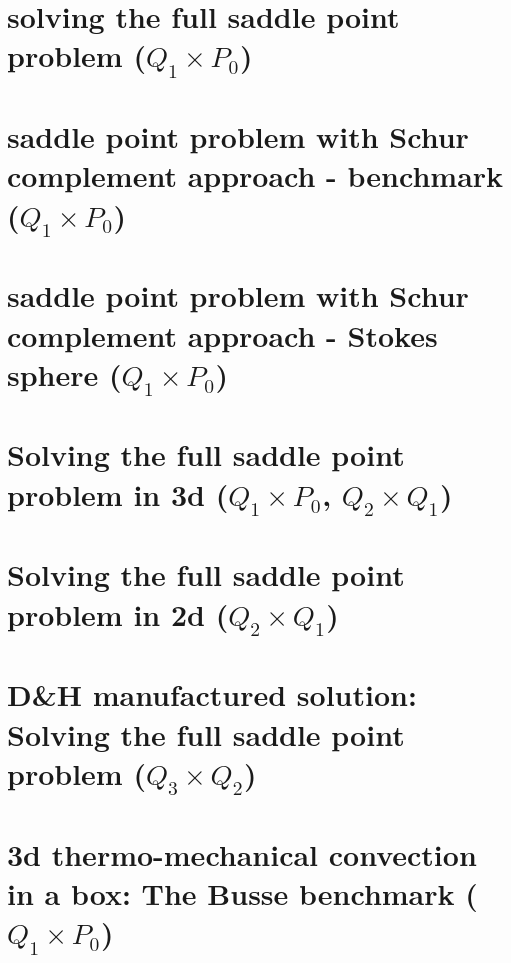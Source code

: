 \documentclass[a4paper,11pt]{report}
\begin{document}
\chapter{solving the full saddle point problem ($Q_1\times P_0$) \label{f14}} %

\chapter{saddle point problem with Schur complement approach - benchmark ($Q_1\times P_0$)\label{f15}} %

\chapter{saddle point problem with Schur complement approach - Stokes sphere ($Q_1\times P_0$) \label{f16}} %

\chapter{Solving the full saddle point problem in 3d ($Q_1\times P_0$, $Q_2\times Q_1$)\label{f17}} %

\chapter{Solving the full saddle point problem in 2d ($Q_2\times Q_1$) \label{f18}} %

\chapter{D\&H manufactured solution: Solving the full saddle point problem ($Q_3\times Q_2$) \label{f19}} %

\chapter{3d thermo-mechanical convection in a box: The Busse benchmark ($Q_1\times P_0$) \label{f20}} %
\end{document}
